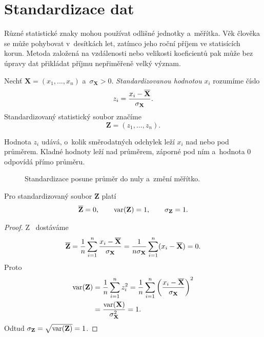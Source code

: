 \section{Standardizace dat}\label{sec:ai-standardizace}

Různé statistické znaky mohou používat odlišné jednotky a~měřítka. Věk člověka se může pohybovat v~desítkách let, zatímco jeho roční příjem ve statisících korun. Metoda založená na vzdálenosti nebo velikosti koeficientů pak může bez úpravy dat přikládat příjmu nepřiměřeně velký význam.

\begin{definition}\label{def:ai-standardizace}
    Nechť \(\mathbf{X}=(x_1,\ldots,x_n)\) a~\(\sigma_{\mathbf{X}}>0\).
    \emph{Standardizovanou hodnotou} \(x_i\) rozumíme číslo
    \[
        z_i
        =
        \frac{x_i-\overline{\mathbf{X}}}{\sigma_{\mathbf{X}}}.
    \]
    Standardizovaný statistický soubor značíme
    \[
        \mathbf{Z}=(z_1,\ldots,z_n).
    \]
\end{definition}

Hodnota \(z_i\) udává, o~kolik směrodatných odchylek leží \(x_i\) nad nebo pod průměrem. Kladné hodnoty leží nad průměrem, záporné pod ním a~hodnota \(0\) odpovídá přímo průměru.

\begin{figure}[ht]
    \centering
    
    \caption{Standardizace posune průměr do nuly a~změní měřítko.}
    \label{fig:ai-standardizace}
\end{figure}

\begin{proposition}\label{prop:ai-standardizace}
    Pro standardizovaný soubor \(\mathbf{Z}\) platí
    \[
        \overline{\mathbf{Z}}=0,
        \qquad
        \operatorname{var}(\mathbf{Z})=1,
        \qquad
        \sigma_{\mathbf{Z}}=1.
    \]
\end{proposition}

\begin{proof}
    Z~ dostáváme
    \[
        \overline{\mathbf{Z}}
        =
        \frac1n\sum_{i=1}^{n}
        \frac{x_i-\overline{\mathbf{X}}}{\sigma_{\mathbf{X}}}
        =
        \frac{1}{n\sigma_{\mathbf{X}}}
        \sum_{i=1}^{n}(x_i-\overline{\mathbf{X}})
        =
        0.
    \]
    Proto
    \begin{align*}
        \operatorname{var}(\mathbf{Z})
        &=
        \frac1n\sum_{i=1}^{n}z_i^2
        =
        \frac1n\sum_{i=1}^{n}
        \left(
            \frac{x_i-\overline{\mathbf{X}}}{\sigma_{\mathbf{X}}}
        \right)^2\\
        &=
        \frac{\operatorname{var}(\mathbf{X})}{\sigma_{\mathbf{X}}^2}
        =
        1.
    \end{align*}
    Odtud \(\sigma_{\mathbf{Z}}=\sqrt{\operatorname{var}(\mathbf{Z})}=1\).
\end{proof}

